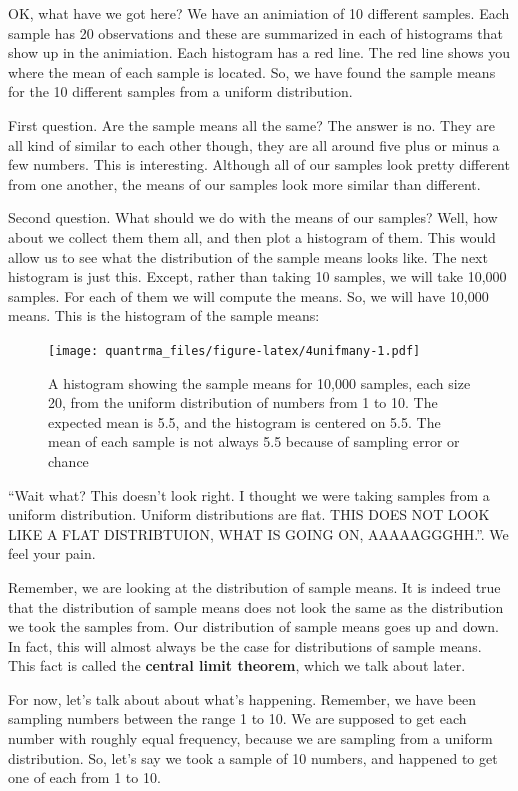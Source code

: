 \documentclass[
]{book}
\begin{document}
OK, what have we got here? We have an animiation of 10 different samples. Each sample has 20 observations and these are summarized in each of histograms that show up in the animiation. Each histogram has a red line. The red line shows you where the mean of each sample is located. So, we have found the sample means for the 10 different samples from a uniform distribution.

First question. Are the sample means all the same? The answer is no. They are all kind of similar to each other though, they are all around five plus or minus a few numbers. This is interesting. Although all of our samples look pretty different from one another, the means of our samples look more similar than different.

Second question. What should we do with the means of our samples? Well, how about we collect them them all, and then plot a histogram of them. This would allow us to see what the distribution of the sample means looks like. The next histogram is just this. Except, rather than taking 10 samples, we will take 10,000 samples. For each of them we will compute the means. So, we will have 10,000 means. This is the histogram of the sample means:

\begin{figure}
\centering
\texttt{[image: quantrma\_files/figure-latex/4unifmany-1.pdf]}
\caption{\label{fig:4unifmany}A histogram showing the sample means for 10,000 samples, each size 20, from the uniform distribution of numbers from 1 to 10. The expected mean is 5.5, and the histogram is centered on 5.5. The mean of each sample is not always 5.5 because of sampling error or chance}
\end{figure}

``Wait what? This doesn't look right. I thought we were taking samples from a uniform distribution. Uniform distributions are flat. THIS DOES NOT LOOK LIKE A FLAT DISTRIBTUION, WHAT IS GOING ON, AAAAAGGGHH.''. We feel your pain.

Remember, we are looking at the distribution of sample means. It is indeed true that the distribution of sample means does not look the same as the distribution we took the samples from. Our distribution of sample means goes up and down. In fact, this will almost always be the case for distributions of sample means. This fact is called the \textbf{central limit theorem}, which we talk about later.

For now, let's talk about about what's happening. Remember, we have been sampling numbers between the range 1 to 10. We are supposed to get each number with roughly equal frequency, because we are sampling from a uniform distribution. So, let's say we took a sample of 10 numbers, and happened to get one of each from 1 to 10.
\end{document}
